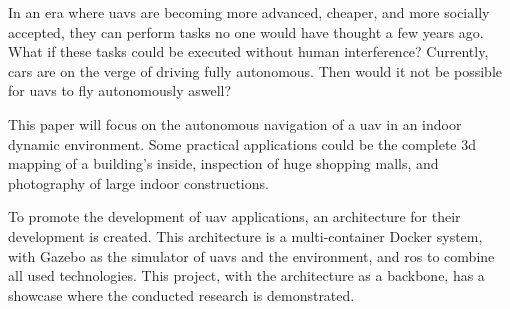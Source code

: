 In an era where \acsp{uav} are becoming more advanced, cheaper, and more socially accepted, they can perform tasks no one would have thought a few years ago. What if these tasks could be executed without human interference? Currently, cars are on the verge of driving fully autonomous. Then would it not be possible for \acsp{uav} to fly autonomously aswell?

This paper will focus on the autonomous navigation of a \acs{uav} in an indoor dynamic environment. Some practical applications could be the complete \acs{3d} mapping of a building's inside, inspection of huge shopping malls, and photography of large indoor constructions. \cite{spiral_robotics}

To promote the development of \acs{uav} applications, an architecture for their development is created. This architecture is a multi\hyp{}container Docker system, with Gazebo as the simulator of \acsp{uav} and the environment, and \acs{ros} to combine all used technologies. This project, with the architecture as a backbone, has a showcase where the conducted research is demonstrated.